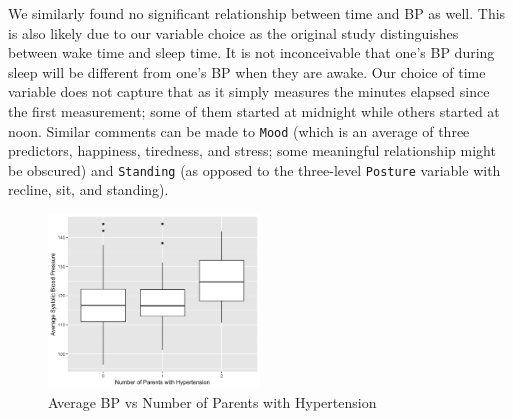 \documentclass[12pt,twoside,letterpaper]{article}
\theoremstyle{definition}
\theoremstyle{definition}
\begin{document}
We similarly found no significant relationship between time and BP as well. This is also likely due to our variable choice as the original study distinguishes between wake time and sleep time. It is not inconceivable that one's BP during sleep will be different from one's BP when they are awake. Our choice of time variable does not capture that as it simply measures the minutes elapsed since the first measurement; some of them started at midnight while others started at noon. Similar comments can be made to \texttt{Mood} (which is an average of three predictors, happiness, tiredness, and stress; some meaningful relationship might be obscured) and \texttt{Standing} (as opposed to the three-level \texttt{Posture} variable with recline, sit, and standing).

\begin{figure} 
\centering
\includegraphics[width=0.5\textwidth]{pics/fh123 v bp.png}
\caption{Average BP vs Number of Parents with Hypertension}
\label{fig: avg bp v fh123}
\end{figure}

\singlespacing
% 
% 
\printbibliography
\end{document}

